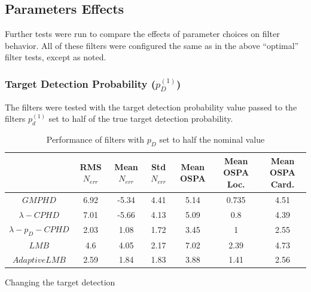 \documentclass{article}
\newcommand{\tgt}{{(1)}}
\begin{document}
\subsection*{Parameters Effects}
Further tests were run to compare the effects of parameter choices on filter behavior. All of these filters were configured the same as in the above ``optimal'' filter tests, except as noted.
\subsubsection*{Target Detection Probability ($p_D^\tgt$)}
The filters were tested with the target detection probability value passed to the filters $p_d^\tgt$ set to half of the true target detection probability.
\begin{table}[H]
  \centering
  \begin{tabular}{ c| c | c | c | c | c | c }
    & RMS $N_{err}$ & Mean $N_{err}$ & Std $N_{err}$ & Mean OSPA & Mean OSPA Loc. & Mean OSPA Card.\\
    \hline
    $GMPHD$ & 6.92 & -5.34 & 4.41 & 5.14 & 0.735 & 4.51 \\
    $\lambda-CPHD$ & 7.01 & -5.66 & 4.13 & 5.09 & 0.8 & 4.39 \\
    $\lambda-p_D-CPHD$ & 2.03 & 1.08 & 1.72 & 3.45 & 1 & 2.55 \\
    $LMB$ & 4.6 & 4.05 & 2.17 & 7.02 & 2.39 & 4.73 \\
    $Adaptive LMB$ & 2.59 & 1.84 & 1.83 & 3.88 & 1.41 & 2.56 \\
  \end{tabular}
  \caption{Performance of filters with $p_D$ set to half the nominal value}
  \label{tab:low_pd}
\end{table}
Changing the target detection 
\end{document}

